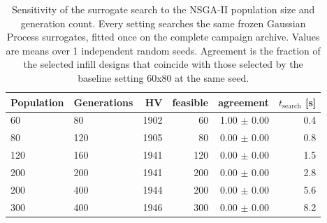 \begin{table}[htbp]
\centering
\caption{Sensitivity of the surrogate search to the NSGA-II population size and generation count. Every setting searches the same frozen Gaussian Process surrogates, fitted once on the complete campaign archive. Values are means over 1 independent random seeds. Agreement is the fraction of the selected infill designs that coincide with those selected by the baseline setting 60x80 at the same seed.}
\label{tab:nsga_sensitivity}
\begin{tabular}{llrrrr}
\toprule
Population & Generations & HV & feasible & agreement & $t_{\mathrm{search}}$ [s] \\
\midrule
60 & 80 & 1902 & 60 & 1.00 $\pm$ 0.00 & 0.4 \\
80 & 120 & 1905 & 80 & 0.00 $\pm$ 0.00 & 0.8 \\
120 & 160 & 1941 & 120 & 0.00 $\pm$ 0.00 & 1.5 \\
200 & 200 & 1941 & 200 & 0.00 $\pm$ 0.00 & 2.8 \\
200 & 400 & 1944 & 200 & 0.00 $\pm$ 0.00 & 5.6 \\
300 & 400 & 1946 & 300 & 0.00 $\pm$ 0.00 & 8.2 \\
\bottomrule
\end{tabular}
\end{table}
